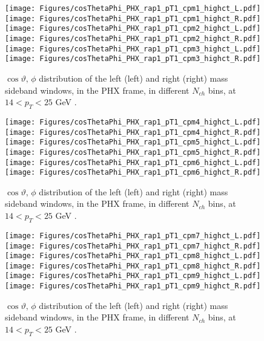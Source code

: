 \documentclass[12pt]{article}
\begin{document}

\begin{figure}[htbp]
\centering
\texttt{[image: Figures/cosThetaPhi\_PHX\_rap1\_pT1\_cpm1\_highct\_L.pdf]}
\texttt{[image: Figures/cosThetaPhi\_PHX\_rap1\_pT1\_cpm1\_highct\_R.pdf]}
\texttt{[image: Figures/cosThetaPhi\_PHX\_rap1\_pT1\_cpm2\_highct\_L.pdf]}
\texttt{[image: Figures/cosThetaPhi\_PHX\_rap1\_pT1\_cpm2\_highct\_R.pdf]}
\texttt{[image: Figures/cosThetaPhi\_PHX\_rap1\_pT1\_cpm3\_highct\_L.pdf]}
\texttt{[image: Figures/cosThetaPhi\_PHX\_rap1\_pT1\_cpm3\_highct\_R.pdf]}
\caption{$\cos\vartheta,\,\phi$ distribution of the left (left) and
  right (right) mass sideband windows, in the PHX frame, in different
  $N_{ch}$ bins, at $14 < p_{T} < 25$ GeV .}
\end{figure}
\clearpage

\begin{figure}[htbp]
\centering
\texttt{[image: Figures/cosThetaPhi\_PHX\_rap1\_pT1\_cpm4\_highct\_L.pdf]}
\texttt{[image: Figures/cosThetaPhi\_PHX\_rap1\_pT1\_cpm4\_highct\_R.pdf]}
\texttt{[image: Figures/cosThetaPhi\_PHX\_rap1\_pT1\_cpm5\_highct\_L.pdf]}
\texttt{[image: Figures/cosThetaPhi\_PHX\_rap1\_pT1\_cpm5\_highct\_R.pdf]}
\texttt{[image: Figures/cosThetaPhi\_PHX\_rap1\_pT1\_cpm6\_highct\_L.pdf]}
\texttt{[image: Figures/cosThetaPhi\_PHX\_rap1\_pT1\_cpm6\_highct\_R.pdf]}
\caption{$\cos\vartheta,\,\phi$ distribution of the left (left) and
  right (right) mass sideband windows, in the PHX frame, in different
  $N_{ch}$ bins, at $14 < p_{T} < 25$ GeV .}
\end{figure}
\clearpage

\begin{figure}[htbp]
\centering
\texttt{[image: Figures/cosThetaPhi\_PHX\_rap1\_pT1\_cpm7\_highct\_L.pdf]}
\texttt{[image: Figures/cosThetaPhi\_PHX\_rap1\_pT1\_cpm7\_highct\_R.pdf]}
\texttt{[image: Figures/cosThetaPhi\_PHX\_rap1\_pT1\_cpm8\_highct\_L.pdf]}
\texttt{[image: Figures/cosThetaPhi\_PHX\_rap1\_pT1\_cpm8\_highct\_R.pdf]}
\texttt{[image: Figures/cosThetaPhi\_PHX\_rap1\_pT1\_cpm9\_highct\_L.pdf]}
\texttt{[image: Figures/cosThetaPhi\_PHX\_rap1\_pT1\_cpm9\_highct\_R.pdf]}
\caption{$\cos\vartheta,\,\phi$ distribution of the left (left) and
  right (right) mass sideband windows, in the PHX frame, in different
  $N_{ch}$ bins, at $14 < p_{T} < 25$ GeV .}
\end{figure}
\clearpage
\end{document}
